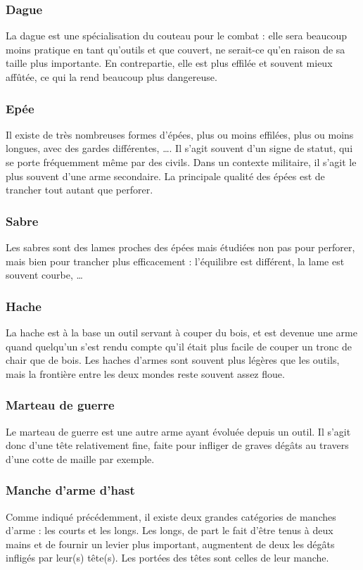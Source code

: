 \documentclass[10pt,a4paper,twocolumn]{book}
\begin{document}
\subsubsection{Dague}
La dague est une spécialisation du couteau pour le combat : elle sera beaucoup moins pratique en tant qu’outils et que couvert, ne serait-ce qu’en raison de sa taille plus importante. En contrepartie, elle est plus effilée et souvent mieux affûtée, ce qui la rend beaucoup plus dangereuse.
\subsubsection{Epée}
Il existe de très nombreuses formes d’épées, plus ou moins effilées, plus ou moins longues, avec des gardes différentes, …. Il s’agit souvent d’un signe de statut, qui se porte fréquemment même par des civils. Dans un contexte militaire, il s’agit le plus souvent d’une arme secondaire. La principale qualité des épées est de trancher tout autant que perforer.
\subsubsection{Sabre}
Les sabres sont des lames proches des épées mais étudiées non pas pour perforer, mais bien pour trancher plus efficacement : l’équilibre est différent, la lame est souvent courbe, … 
\subsubsection{Hache}
La hache est à la base un outil servant à couper du bois, et est devenue une arme quand quelqu’un s’est rendu compte qu’il était plus facile de couper un tronc de chair que de bois. Les haches d’armes sont souvent plus légères que les outils, mais la frontière entre les deux mondes reste souvent assez floue. 
\subsubsection{Marteau de guerre}
Le marteau de guerre est une autre arme ayant évoluée depuis un outil. Il s’agit donc d’une tête relativement fine, faite pour infliger de graves dégâts au travers d’une cotte de maille par exemple.
\subsubsection{Manche d’arme d’hast}
Comme indiqué précédemment, il existe deux grandes catégories de manches d’arme : les courts et les longs. Les longs, de part le fait d’être tenus à deux mains et de fournir un levier plus important, augmentent de deux les dégâts infligés par leur(s) tête(s). Les portées des têtes sont celles de leur manche.
\end{document}
